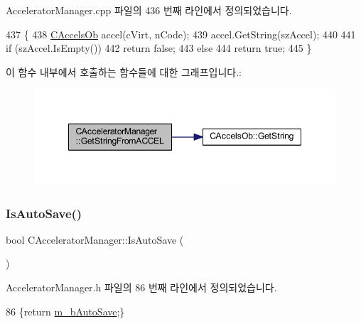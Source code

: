 Accelerator\+Manager.\+cpp 파일의 436 번째 라인에서 정의되었습니다.


\begin{DoxyCode}
437 \{
438   \mbox{\hyperlink{class_c_accels_ob}{CAccelsOb}} accel(cVirt, nCode);
439   accel.GetString(szAccel);
440 
441   \textcolor{keywordflow}{if} (szAccel.IsEmpty())
442     \textcolor{keywordflow}{return} \textcolor{keyword}{false};
443   \textcolor{keywordflow}{else}
444     \textcolor{keywordflow}{return} \textcolor{keyword}{true};
445 \}
\end{DoxyCode}
이 함수 내부에서 호출하는 함수들에 대한 그래프입니다.\+:
\nopagebreak
\begin{figure}[H]
\begin{center}
\leavevmode
\includegraphics[width=348pt]{class_c_accelerator_manager_adf91477de6b9df320930786c9755b0eb_cgraph}
\end{center}
\end{figure}
\mbox{\label{class_c_accelerator_manager_a895420283e3ce58576ded1a3f999724a}} 
\subsubsection{\texorpdfstring{Is\+Auto\+Save()}{IsAutoSave()}}
{\footnotesize\ttfamily bool C\+Accelerator\+Manager\+::\+Is\+Auto\+Save (\begin{DoxyParamCaption}{ }\end{DoxyParamCaption})\hspace{0.3cm}{\ttfamily [inline]}}



Accelerator\+Manager.\+h 파일의 86 번째 라인에서 정의되었습니다.


\begin{DoxyCode}
86 \{\textcolor{keywordflow}{return} \mbox{\hyperlink{class_c_accelerator_manager_a37b504c74c13ca2d62eea8abffe73102}{m\_bAutoSave}};\}
\end{DoxyCode}
\mbox{\label{class_c_accelerator_manager_a508e56037762d035758491d12fd10dfa}} 
